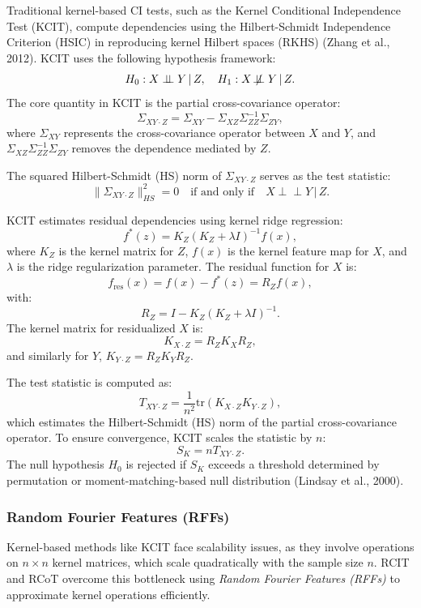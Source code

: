 \documentclass[
]{article}
\begin{document}
Traditional kernel-based CI tests, such as the Kernel Conditional
Independence Test (KCIT), compute dependencies using the Hilbert-Schmidt
Independence Criterion (HSIC) in reproducing kernel Hilbert spaces
(RKHS) (Zhang et al., 2012). KCIT uses the following hypothesis
framework: \[
H_0: X \perp\!\!\!\perp Y \,|\, Z, \quad H_1: X \not\!\perp\!\!\!\perp Y \,|\, Z.
\] The core quantity in KCIT is the partial cross-covariance operator:
\[
\Sigma_{XY \cdot Z} = \Sigma_{XY} - \Sigma_{XZ} \Sigma_{ZZ}^{-1} \Sigma_{ZY},
\] where \(\Sigma_{XY}\) represents the cross-covariance operator
between \(X\) and \(Y\), and
\(\Sigma_{XZ} \Sigma_{ZZ}^{-1} \Sigma_{ZY}\) removes the dependence
mediated by \(Z\).

The squared Hilbert-Schmidt (HS) norm of \(\Sigma_{XY \cdot Z}\) serves
as the test statistic: \[
\|\Sigma_{XY \cdot Z}\|^2_{HS} = 0 \quad \text{if and only if} \quad X \perp\!\!\!\perp Y \,|\, Z.
\]

KCIT estimates residual dependencies using kernel ridge regression: \[
f^*(z) = K_Z (K_Z + \lambda I)^{-1} f(x),
\] where \(K_Z\) is the kernel matrix for \(Z\), \(f(x)\) is the kernel
feature map for \(X\), and \(\lambda\) is the ridge regularization
parameter. The residual function for \(X\) is: \[
f_\text{res}(x) = f(x) - f^*(z) = R_Z f(x),
\] with: \[
R_Z = I - K_Z (K_Z + \lambda I)^{-1}.
\] The kernel matrix for residualized \(X\) is: \[
K_{X \cdot Z} = R_Z K_X R_Z,
\] and similarly for \(Y\), \(K_{Y \cdot Z} = R_Z K_Y R_Z\).

The test statistic is computed as: \[
T_{XY \cdot Z} = \frac{1}{n^2} \text{tr}(K_{X \cdot Z} K_{Y \cdot Z}),
\] which estimates the Hilbert-Schmidt (HS) norm of the partial
cross-covariance operator. To ensure convergence, KCIT scales the
statistic by \(n\): \[
S_K = n T_{XY \cdot Z}.
\] The null hypothesis \(H_0\) is rejected if \(S_K\) exceeds a
threshold determined by permutation or moment-matching-based null
distribution (Lindsay et al., 2000).

\subsubsection{Random Fourier Features
(RFFs)}\label{random-fourier-features-rffs}

Kernel-based methods like KCIT face scalability issues, as they involve
operations on \(n \times n\) kernel matrices, which scale quadratically
with the sample size \(n\). RCIT and RCoT overcome this bottleneck using
\emph{Random Fourier Features (RFFs)} to approximate kernel operations
efficiently.
\end{document}
